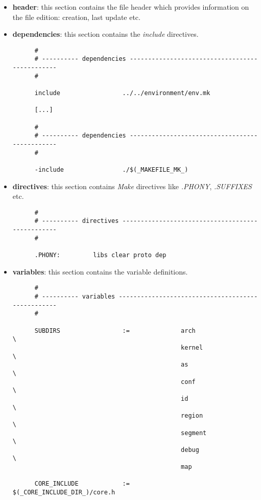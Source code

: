 \begin{itemize}
  \item
    \textbf{header}: this section contains the file header which provides
    information on the file edition: creation, last update etc.
  \item
    \textbf{dependencies}: this section contains the \textit{include}
    directives.

    \begin{verbatim}
      #
      # ---------- dependencies -----------------------------------------------
      #

      include                 ../../environment/env.mk

      [...]

      #
      # ---------- dependencies -----------------------------------------------
      #

      -include                ./$(_MAKEFILE_MK_)
    \end{verbatim}
  \item
    \textbf{directives}: this section contains \textit{Make} directives
    like \textit{.PHONY}, \textit{.SUFFIXES} etc.

    \begin{verbatim}
      #
      # ---------- directives -------------------------------------------------
      #

      .PHONY:         libs clear proto dep
    \end{verbatim}
  \item
    \textbf{variables}: this section contains the variable definitions.

    \begin{verbatim}
      #
      # ---------- variables --------------------------------------------------
      #

      SUBDIRS                 :=              arch                      \
                                              kernel                    \
                                              as                        \
                                              conf                      \
                                              id                        \
                                              region                    \
                                              segment                   \
                                              debug                     \
                                              map                       

      CORE_INCLUDE            :=              $(_CORE_INCLUDE_DIR_)/core.h


\end{verbatim}
\end{itemize}
